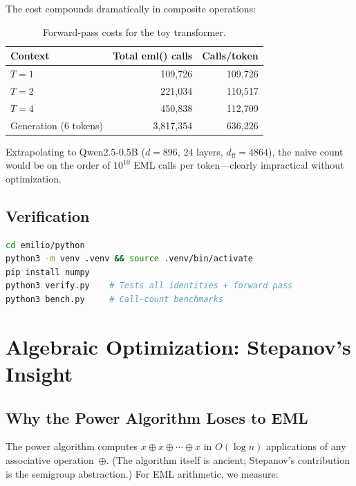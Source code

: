\documentclass[acmsmall,nonacm]{acmart}
\begin{document}
The cost compounds dramatically in composite operations:

\begin{table}[h]
\caption{Forward-pass costs for the toy transformer.}
\label{tab:forward-cost}
\centering
\begin{tabular}{lrr}
\toprule
\textbf{Context} & \textbf{Total eml() calls} & \textbf{Calls/token} \\
\midrule
$T=1$ & 109,726  & 109,726 \\
$T=2$ & 221,034  & 110,517 \\
$T=4$ & 450,838  & 112,709 \\
Generation (6 tokens) & 3,817,354 & 636,226 \\
\bottomrule
\end{tabular}
\end{table}

Extrapolating to Qwen2.5-0.5B ($d=896$, 24 layers, $d_{\text{ff}}=4864$),
the naive count would be on the order of $10^{10}$ EML calls per
token---clearly impractical without optimization.

\subsection{Verification}

\begin{lstlisting}[language=bash,caption={Running the Python POC.}]
cd emilio/python
python3 -m venv .venv && source .venv/bin/activate
pip install numpy
python3 verify.py    # Tests all identities + forward pass
python3 bench.py     # Call-count benchmarks
\end{lstlisting}


\section{Algebraic Optimization: Stepanov's Insight}
\label{sec:stepanov}

\subsection{Why the Power Algorithm Loses to EML}

The power algorithm computes $x \oplus x \oplus \cdots \oplus x$
in $O(\log n)$ applications of any associative operation~$\oplus$.
(The algorithm itself is ancient; Stepanov's contribution is the
semigroup abstraction.)  For EML arithmetic, we measure:
\end{document}
